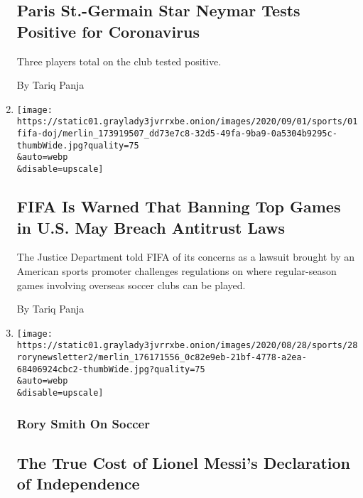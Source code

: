 \begin{enumerate}
{  \subsection{Paris St.-Germain Star Neymar Tests Positive for
  Coronavirus}\label{paris-st-germain-star-neymar-tests-positive-for-coronavirus}}

  Three players total on the club tested positive.

  By Tariq Panja
\item
  \href{/2020/09/01/sports/soccer/fifa-antitrust-us.html}{}

  \texttt{[image: https://static01.graylady3jvrrxbe.onion/images/2020/09/01/sports/01fifa-doj/merlin\_173919507\_dd73e7c8-32d5-49fa-9ba9-0a5304b9295c-thumbWide.jpg?quality=75\\\&auto=webp\\\&disable=upscale]}

  \hypertarget{fifa-is-warned-that-banning-top-games-in-us-may-breach-antitrust-laws}{%
  \subsection{FIFA Is Warned That Banning Top Games in U.S. May Breach
  Antitrust
  Laws}\label{fifa-is-warned-that-banning-top-games-in-us-may-breach-antitrust-laws}}

  The Justice Department told FIFA of its concerns as a lawsuit brought
  by an American sports promoter challenges regulations on where
  regular-season games involving overseas soccer clubs can be played.

  By Tariq Panja
\item
  \href{/2020/08/28/sports/soccer/lionel-messi-barcelona.html}{}

  \texttt{[image: https://static01.graylady3jvrrxbe.onion/images/2020/08/28/sports/28rorynewsletter2/merlin\_176171556\_0c82e9eb-21bf-4778-a2ea-68406924cbc2-thumbWide.jpg?quality=75\\\&auto=webp\\\&disable=upscale]}

  \hypertarget{rory-smith-on-soccer-1}{%
  \subsubsection{Rory Smith On Soccer}\label{rory-smith-on-soccer-1}}

  \hypertarget{the-true-cost-of-lionel-messis-declaration-of-independence}{%
  \subsection{The True Cost of Lionel Messi's Declaration of
  Independence}\label{the-true-cost-of-lionel-messis-declaration-of-independence}}


\end{enumerate}
